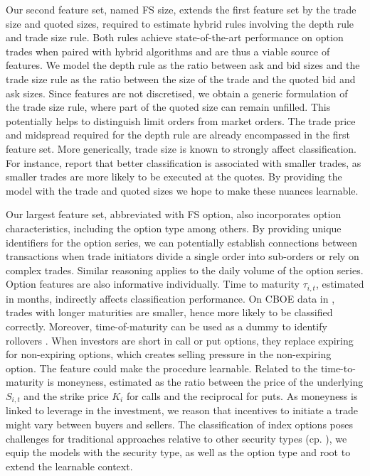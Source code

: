 Our second feature set, named \gls{FS} size, extends the first feature set by the trade size and quoted sizes, required to estimate hybrid rules involving the depth rule and trade size rule. Both rules achieve state-of-the-art performance on option trades when paired with hybrid algorithms and are thus a viable source of features. We model the depth rule as the ratio between ask and bid sizes and the trade size rule as the ratio between the size of the trade and the quoted bid and ask sizes. Since features are not discretised, we obtain a generic formulation of the trade size rule, where part of the quoted size can remain unfilled. This potentially helps to distinguish limit orders from market orders. The trade price and midspread required for the depth rule are already encompassed in the first feature set. More generically, trade size is known to strongly affect classification. For instance, \textcites[][889]{savickasInferringDirectionOption2003}[][537]{ellisAccuracyTradeClassification2000} report that better classification is associated with smaller trades, as smaller trades are more likely to be executed at the quotes. By providing the model with the trade and quoted sizes we hope to make these nuances learnable.

Our largest feature set, abbreviated with \gls{FS} option, also incorporates option characteristics, including the option type among others. By providing unique identifiers for the option series, we can potentially establish connections between transactions when trade initiators divide a single order into sub-orders or rely on complex trades. Similar reasoning applies to the daily volume of the option series. Option features are also informative individually. Time to maturity $\tau_{i,t}$, estimated in months, indirectly affects classification performance. On \gls{CBOE} data in \textcite[][889]{savickasInferringDirectionOption2003}, trades with longer maturities are smaller, hence more likely to be classified correctly. Moreover, time-of-maturity can be used as a dummy to identify rollovers \autocite[][700]{muravyevOrderFlowExpected2016}. When investors are short in call or put options, they replace expiring for non-expiring options, which creates selling pressure in the non-expiring option. The feature could make the procedure learnable. Related to the time-to-maturity is moneyness, estimated as the ratio between the price of the underlying $S_{i,t}$ and the strike price $K_{i}$ for calls and the reciprocal for puts. As moneyness is linked to leverage in the investment, we reason that incentives to initiate a trade might vary between buyers and sellers. The classification of index options poses challenges for traditional approaches relative to other security types (cp. \textcites[][22]{grauerOptionTradeClassification2022}[][898-899]{savickasInferringDirectionOption2003}), we equip the models with the security type, as well as the option type and root to extend the learnable context.


